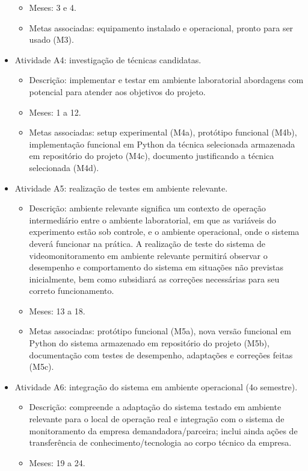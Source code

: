 \begin{itemize}
\begin{itemize}
		\item Meses: 3 e 4.
		\item Metas associadas: equipamento instalado e operacional, pronto para ser usado (M3).
	\end{itemize}
	\item Atividade A4: investigação de técnicas candidatas.
	\begin{itemize}
		\item Descrição: implementar e testar em ambiente laboratorial abordagens com potencial para atender aos objetivos do projeto.
		\item Meses: 1 a 12.
		\item Metas associadas: setup experimental (M4a), protótipo funcional (M4b), implementação funcional em Python da técnica selecionada armazenada em repositório do projeto (M4c), documento justificando a técnica selecionada (M4d).
	\end{itemize}
	\item Atividade A5: realização de testes em ambiente relevante.
	\begin{itemize}
		\item Descrição: ambiente relevante significa um contexto de operação intermediário entre o ambiente laboratorial, em que as variáveis do experimento estão sob controle, e o ambiente operacional, onde o sistema deverá funcionar na prática. A realização de teste do sistema de videomonitoramento em ambiente relevante permitirá observar o desempenho e comportamento do sistema em situações não previstas inicialmente, bem como subsidiará as correções necessárias para seu correto funcionamento.
		\item Meses: 13 a 18.
		\item Metas associadas: protótipo funcional (M5a), nova versão funcional em Python do sistema armazenado em repositório do projeto (M5b), documentação com testes de desempenho, adaptações e correções feitas (M5c).
	\end{itemize}
	\item Atividade A6: integração do sistema em ambiente operacional (4o semestre).
	\begin{itemize}
		\item Descrição: compreende a adaptação do sistema testado em ambiente relevante para o local de operação real e integração com o sistema de monitoramento da empresa demandadora/parceira; inclui ainda ações de transferência de conhecimento/tecnologia ao corpo técnico da empresa.
		\item Meses: 19 a 24.

\end{itemize}
\end{itemize}
